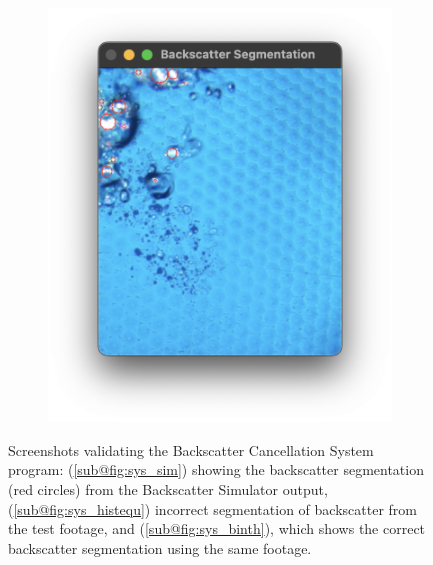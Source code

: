 \begin{figure}[H]
\begin{subfigure}{.25\textwidth}
        \caption{}
        \label{fig:sys_histequ}
    \end{subfigure}
    \hfill
    \begin{subfigure}{.25\textwidth}
        \centering
        \includegraphics[width=1\linewidth]{assets/sys_binth.png}
        \caption{}
        \label{fig:sys_binth}
    \end{subfigure}
    \caption{Screenshots validating the Backscatter Cancellation System program: (\ref{sub@fig:sys_sim}) showing the backscatter segmentation (red circles) from the Backscatter Simulator output, (\ref{sub@fig:sys_histequ}) incorrect segmentation of backscatter from the test footage, and (\ref{sub@fig:sys_binth}), which shows the correct backscatter segmentation using the same footage.}
    \label{fig:sys_validate}
\end{figure}

